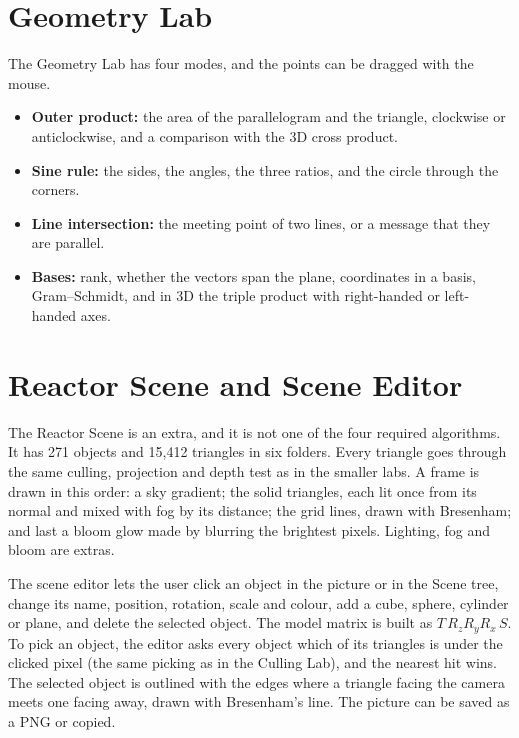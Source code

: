 \section{Geometry Lab}
The Geometry Lab has four modes, and the points can be dragged with the mouse.
\begin{itemize}
\item \textbf{Outer product:} the area of the parallelogram and the triangle, clockwise or anticlockwise, and a comparison with the 3D cross product.
\item \textbf{Sine rule:} the sides, the angles, the three ratios, and the circle through the corners.
\item \textbf{Line intersection:} the meeting point of two lines, or a message that they are parallel.
\item \textbf{Bases:} rank, whether the vectors span the plane, coordinates in a basis, Gram--Schmidt, and in 3D the triple product with right-handed or left-handed axes.
\end{itemize}


\section{Reactor Scene and Scene Editor}
The Reactor Scene is an extra, and it is not one of the four required algorithms. It has 271 objects and 15,412 triangles in six folders. Every triangle goes through the same culling, projection and depth test as in the smaller labs. A frame is drawn in this order: a sky gradient; the solid triangles, each lit once from its normal and mixed with fog by its distance; the grid lines, drawn with Bresenham; and last a bloom glow made by blurring the brightest pixels. Lighting, fog and bloom are extras.

The scene editor lets the user click an object in the picture or in the Scene tree, change its name, position, rotation, scale and colour, add a cube, sphere, cylinder or plane, and delete the selected object. The model matrix is built as $T\,R_zR_yR_x\,S$. To pick an object, the editor asks every object which of its triangles is under the clicked pixel (the same picking as in the Culling Lab), and the nearest hit wins. The selected object is outlined with the edges where a triangle facing the camera meets one facing away, drawn with Bresenham's line. The picture can be saved as a PNG or copied.

